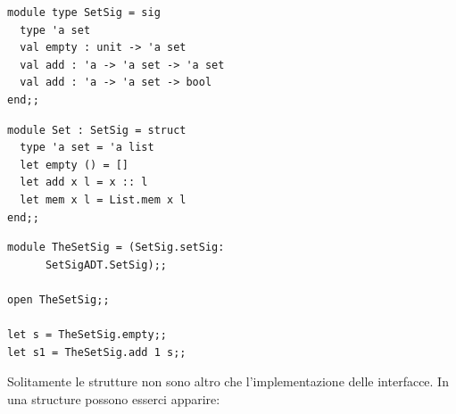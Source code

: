 \documentclass{article}
\begin{document}
\begin{minipage}{0.3\textwidth}
\begin{verbatim}
module type SetSig = sig
  type 'a set
  val empty : unit -> 'a set
  val add : 'a -> 'a set -> 'a set
  val add : 'a -> 'a set -> bool
end;;
\end{verbatim}
\end{minipage}
\begin{minipage}{0.3\textwidth}
\begin{verbatim}
module Set : SetSig = struct
  type 'a set = 'a list
  let empty () = []
  let add x l = x :: l
  let mem x l = List.mem x l
end;;
\end{verbatim}
\end{minipage}
\begin{minipage}{0.3\textwidth}
\begin{verbatim}
module TheSetSig = (SetSig.setSig: 
      SetSigADT.SetSig);;

open TheSetSig;;

let s = TheSetSig.empty;;
let s1 = TheSetSig.add 1 s;;
\end{verbatim}
\end{minipage}

\vspace*{0.5cm}

\hspace*{0.5cm}Solitamente le strutture non sono altro che l'implementazione delle interfacce.
In una structure possono esserci apparire:

\vspace*{0.5cm}
\end{document}
